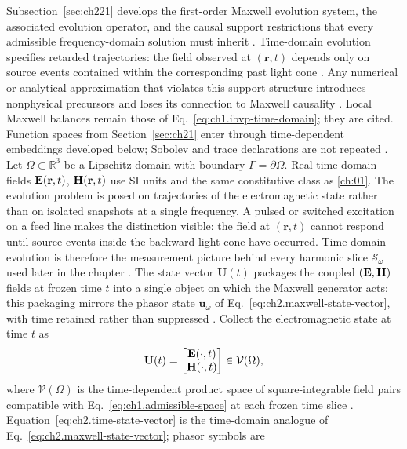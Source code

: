 Subsection~\ref{sec:ch221} develops the first-order Maxwell evolution system, the associated evolution operator, and the causal support restrictions that every admissible frequency-domain solution must inherit \cite{stratton1941}.
Time-domain evolution specifies retarded trajectories: the field observed at
$(\mathbf{r},t)$ depends only on source events contained within the corresponding past
light cone \cite{stratton1941}. Any numerical or analytical approximation that violates
this support structure introduces nonphysical precursors and loses its connection to
Maxwell causality \cite{harrington2001}. Local Maxwell balances remain those of
Eq.~\eqref{eq:ch1.ibvp-time-domain}; they are cited. Function spaces from
Section~\ref{sec:ch21} enter through time-dependent embeddings developed below; Sobolev and
trace declarations are not repeated \cite{stratton1941}.
Let \(\Omega\subset\mathbb{R}^{3}\) be a Lipschitz domain with boundary
\(\Gamma=\partial\Omega\). Real time-domain fields
\(\mathbf{E}(\mathbf{r},t)\), \(\mathbf{H}(\mathbf{r},t)\) use SI units and the same constitutive
class as \ref{ch:01}.
The evolution problem is posed on trajectories of the electromagnetic state rather
than on isolated snapshots at a single frequency.
A pulsed or switched excitation on a feed line makes the distinction visible: the field at
$(\mathbf{r},t)$ cannot respond until source events inside the backward light cone have
occurred. Time-domain evolution is therefore the measurement picture behind every harmonic
slice $\mathcal{S}_\omega$ used later in the chapter \cite{stratton1941}. The state vector
$\mathbf{U}(t)$ packages the coupled $(\mathbf{E},\mathbf{H})$ fields at frozen time $t$ into a single
object on which the Maxwell generator acts; this packaging mirrors the phasor state $\mathbf{u}_\omega$ of Eq.~\eqref{eq:ch2.maxwell-state-vector},
with time retained rather than suppressed \cite{harrington2001}. Collect the
electromagnetic state at time \(t\) as
\begin{equation}
\label{eq:ch2.time-state-vector}
\mathbf{U}(t)
=
\begin{bmatrix}\mathbf{E}(\cdot,t)\\ \mathbf{H}(\cdot,t)\end{bmatrix}
\in\mathcal{V}(\Omega),
\end{equation}
where \(\mathcal{V}(\Omega)\) is the time-dependent product space of square-integrable
field pairs compatible with Eq.~\eqref{eq:ch1.admissible-space} at each frozen time
slice \cite{stratton1941}. Equation~\eqref{eq:ch2.time-state-vector} is the
time-domain analogue of Eq.~\eqref{eq:ch2.maxwell-state-vector}; phasor symbols are
